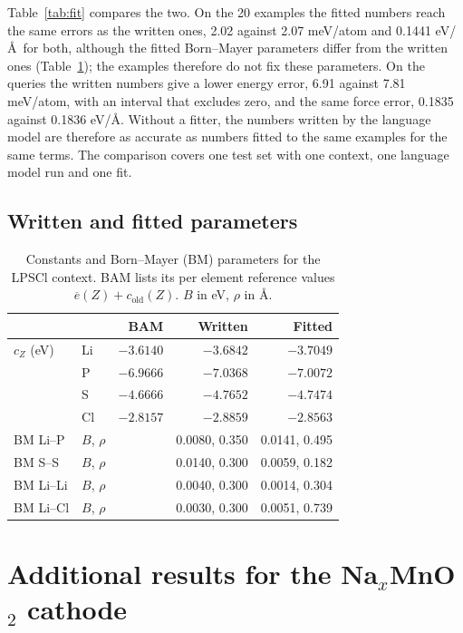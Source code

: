 Table~\ref{tab:fit} compares the two. On the 20 examples the fitted numbers reach the same errors as the written ones, 2.02 against 2.07 meV/atom and 0.1441 eV/\AA\ for both, although the fitted Born--Mayer parameters differ from the written ones (Table~\ref{tab:fit-terms}); the examples therefore do not fix these parameters. On the queries the written numbers give a lower energy error, 6.91 against 7.81 meV/atom, with an interval that excludes zero, and the same force error, 0.1835 against 0.1836 eV/\AA. Without a fitter, the numbers written by the language model are therefore as accurate as numbers fitted to the same examples for the same terms. The comparison covers one test set with one context, one language model run and one fit.

\clearpage
\subsection{Written and fitted parameters}

\begin{table}[!ht]
\caption{Constants and Born--Mayer (BM) parameters for the LPSCl context. BAM lists its per element reference values $\overline e(Z)+c_{\mathrm{old}}(Z)$. $B$ in eV, $\rho$ in \AA.}
\label{tab:fit-terms}
\footnotesize
\centering
\begin{tabular}{llrrr}
\toprule
 & & BAM & Written & Fitted \\
\midrule
$c_Z$ (eV) & Li & $-3.6140$ & $-3.6842$ & $-3.7049$ \\
 & P & $-6.9666$ & $-7.0368$ & $-7.0072$ \\
 & S & $-4.6666$ & $-4.7652$ & $-4.7474$ \\
 & Cl & $-2.8157$ & $-2.8859$ & $-2.8563$ \\
\midrule
BM Li--P & $B$, $\rho$ & & 0.0080, 0.350 & 0.0141, 0.495 \\
BM S--S & $B$, $\rho$ & & 0.0140, 0.300 & 0.0059, 0.182 \\
BM Li--Li & $B$, $\rho$ & & 0.0040, 0.300 & 0.0014, 0.304 \\
BM Li--Cl & $B$, $\rho$ & & 0.0030, 0.300 & 0.0051, 0.739 \\
\bottomrule
\end{tabular}
\end{table}

\FloatBarrier
\clearpage

\fi
\section{Additional results for the Na$_x$MnO$_2$ cathode}
\label{si:cathode-runs}

